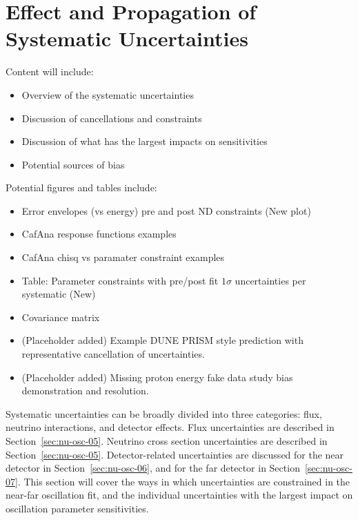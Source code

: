 \section{Effect and Propagation of Systematic Uncertainties}
\label{sec:physics-lbnosc-syst}
Content will include: 
\begin{itemize}
    \item Overview of the systematic uncertainties
    \item Discussion of cancellations and constraints
    \item Discussion of what has the largest impacts on sensitivities
    \item Potential sources of bias
\end{itemize}

Potential figures and tables include: 
\begin{itemize}
\item Error envelopes (vs energy) pre and post ND constraints (New plot)
\item CafAna response functions examples 
\item CafAna chisq vs paramater constraint examples 
\item Table: Parameter constraints with pre/post fit $1\sigma$ uncertainties per systematic (New)
\item Covariance matrix 
\item (Placeholder added) Example DUNE PRISM style prediction with representative cancellation of uncertainties.
\item (Placeholder added) Missing proton energy fake data study bias demonstration and resolution.
\end{itemize}

Systematic uncertainties can be broadly divided into three categories: flux, neutrino interactions, and detector effects. Flux uncertainties are described in Section~\ref{sec:nu-osc-05}. Neutrino cross section uncertainties are described in Section~\ref{sec:nu-osc-05}. Detector-related uncertainties are discussed for the near detector in Section~\ref{sec:nu-osc-06}, and for the far detector in Section~\ref{sec:nu-osc-07}. This section will cover the ways in which uncertainties are constrained in the near-far oscillation fit, and the individual uncertainties with the largest impact on oscillation parameter sensitivities.

